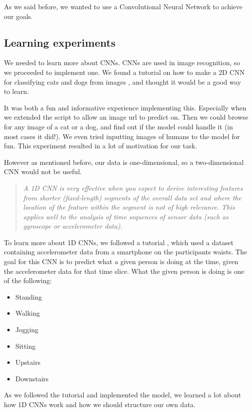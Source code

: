 As we said before, we wanted to use a Convolutional Neural Network to achieve our goals. 

\subsection{Learning experiments}

We needed to learn more about CNNs. CNNs are used in image recognition, so we proceeded to implement one. We found a tutorial on how to make 
a 2D CNN for classifying cats and dogs from images \cite{2d_cnn}, and thought it would be a good way to learn.

It was both a fun and informative experience implementing this. Especially when we extended the script to allow an image url to predict on. 
Then we could browse for any image of a cat or a dog, and find out if the model could handle it (in most cases it did!). 
We even tried inputting images of humans to the model for fun. This experiment resulted in a lot of motivation for our task.

However as mentioned before, our data is one-dimensional, so a two-dimensional CNN would not be useful.

\begin{quote}
  \textit{A 1D CNN is very effective when you expect to derive interesting features from shorter (fixed-length) segments of the overall data set 
  and where the location of the feature within the segment is not of high relevance. This applies well to the analysis of time sequences of sensor data 
  (such as gyroscope or accelerometer data).} \cite{1d_cnn}
\end{quote}

To learn more about 1D CNNs, we followed a tutorial \cite{1d_cnn}, which used a dataset containing 
accelerometer data from a smartphone on the participants waists. The goal for this CNN is to predict what a given person is doing 
at the time, given the accelerometer data for that time slice. What the given person is doing is one of the following:
\begin{itemize}
  \item Standing
  \item Walking
  \item Jogging
  \item Sitting
  \item Upstairs
  \item Downstairs
\end{itemize}

As we followed the tutorial and implemented the model, we learned a lot about how 1D CNNs work and how we should structure our own data. 

